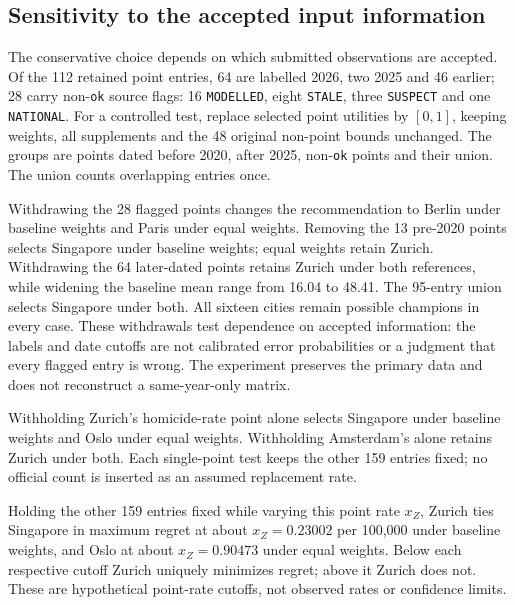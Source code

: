 \subsection{Sensitivity to the accepted input information}\label{sec:sourcepolicy}
The conservative choice depends on which submitted observations are accepted.
Of the 112 retained point entries, 64 are labelled 2026, two 2025 and 46 earlier;
28 carry non-\texttt{ok} source flags: 16 \texttt{MODELLED}, eight \texttt{STALE},
three \texttt{SUSPECT} and one \texttt{NATIONAL}.
For a controlled test, replace selected point utilities by $[0,1]$, keeping
weights, all supplements and the 48 original non-point bounds unchanged.
The groups are points dated before 2020, after 2025, non-\texttt{ok} points and
their union. The union counts overlapping entries once.



Withdrawing the 28 flagged points changes the recommendation to Berlin under
baseline weights and Paris under equal weights. Removing the 13 pre-2020 points
selects Singapore under baseline weights; equal weights retain Zurich.
Withdrawing the 64 later-dated points retains Zurich under both references,
while widening the baseline mean range from 16.04 to 48.41. The 95-entry union
selects Singapore under both. All sixteen cities remain possible champions
in every case. These withdrawals test dependence on accepted information:
the labels and date cutoffs are not calibrated error probabilities or a
judgment that every flagged entry is wrong. The experiment preserves the
primary data and does not reconstruct a same-year-only matrix.

Withholding Zurich's homicide-rate point alone selects Singapore under baseline
weights and Oslo under equal weights. Withholding Amsterdam's alone retains
Zurich under both. Each single-point test keeps the other 159 entries fixed;
no official count is inserted as an assumed replacement rate.

Holding the other 159 entries fixed while varying this point rate $x_Z$, Zurich ties Singapore in maximum regret at about $x_Z=0.23002$ per 100,000 under baseline weights, and Oslo at about $x_Z=0.90473$ under equal weights. Below each respective cutoff Zurich uniquely minimizes regret; above it Zurich does not. These are hypothetical point-rate cutoffs, not observed rates or confidence limits.

